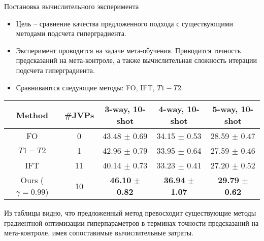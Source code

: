 \documentclass[aspectratio=169]{beamer}
\begin{document}
\begin{frame}{Постановка вычислительного эксперимента}
  \begin{itemize}
    \item Цель -- сравнение качества предложенного подхода с существующими методами подсчета гиперградиента.
    \item Эксперимент проводится на задаче мета-обучения. Приводится точность предсказаний на мета-контроле,
    а также вычислительная сложность итерации подсчета гиперградиента.
    \item Сравниваются следующие методы: FO, IFT, $T1-T2$.
  \end{itemize}
  \begin{table}
    \centering
    \begin{tabular}{c|c|ccc}
    \toprule
    \textbf{Method} & \textbf{\#JVPs} & \textbf{3-way, 10-shot} & \textbf{4-way, 10-shot} & \textbf{5-way, 10-shot} \\ \midrule
    FO & 0 & 43.48 $\pm$ 0.69 & 34.15 $\pm$ 0.53 & 28.59 $\pm$ 0.47 \\
    $T1-T2$ & 1 & 42.96 $\pm$ 0.79 & 33.95 $\pm$ 0.64 & 27.59 $\pm$ 0.46 \\
    IFT & 11 & 40.14 $\pm$ 0.73 & 33.23 $\pm$ 0.41 & 27.20 $\pm$ 0.52 \\
    Ours ($\gamma = 0.99$) & 10 & \textbf{46.10} $\pm$ \textbf{0.82} & \textbf{36.94} $\pm$ \textbf{1.07} & \textbf{29.79} $\pm$ \textbf{0.62} \\ \bottomrule
    \end{tabular}
\end{table}

Из таблицы видно, что предложенный метод превосходит существующие методы градиентной оптимизации гиперпараметров в терминах 
точности предсказаний на мета-контроле, имея сопоставимые вычислительные затраты.
  
\end{frame}






\end{document}
